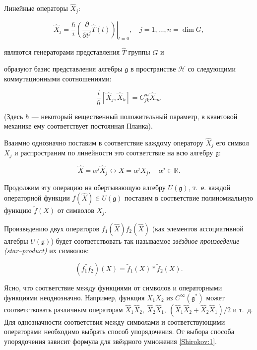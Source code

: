 Линейные операторы $\hat X_j$:

    \[\hat X_j=\frac{\hbar}{i}\left.\left(\frac{\partial}{\partial t^j}\hat T(t)\right)\right|_{t=0},\quad j=1,\dots,n=\dim G,

\]

являются генераторами представления $\hat T$ группы $G$ и

образуют базис представления алгебры $\mathfrak{g}$ в пространстве $\mathcal{H}$ со следующими коммутационными соотношениями:

\begin{equation}

\label{Shirokov:0}

\frac{i}{\hbar}[\hat X_j,\hat X_k]=C_{jk}^m \hat X_m.

\end{equation}

(Здесь $\hbar$ --- некоторый вещественный положительный параметр, в квантовой механике ему соответствует постоянная Планка).



Взаимно однозначно поставим в соответствие каждому оператору $\hat X_j$ его символ $X_j$ и распространим по линейности это соответствие на всю алгебру $\mathfrak{g}$: 

$$\hat X=\alpha^j\hat X_j\longleftrightarrow X=\alpha^jX_j,\quad  \alpha^j\in\mathbb{R}.$$

Продолжим эту операцию на обертывающую алгебру $U(\mathfrak{g})$, т.~е. каждой операторной функции $f(\hat X)\in U(\mathfrak{g})$ поставим в соответствие полиномиальную функцию $\tilde f(X)$ от символов $X_j$.



Произведению двух операторов $f_1(\hat X)f_2(\hat X)$ (как элементов ассоциативной алгебры $U(\mathfrak{g})$) будет соответствовать так называемое \textit{звёздное произведение (star--product)} \cite{Berezin} их символов:

\begin{equation}\label{Shirokov:1}

(\widetilde{f_1f_2})(X)=\tilde f_1(X)\ast \tilde f_2(X).

\end{equation}

Ясно, что соответствие между функциями от символов и операторными функциями неоднозначно. Например, функция $X_1X_2$ из $C^\infty(\mathfrak{g}^\ast)$ может соответствовать различным операторам $\hat X_1\hat X_2,\ \hat X_2\hat X_1,\ (\hat X_1\hat X_2+\hat X_2\hat X_1)/2$ и т.~д. Для однозначности соответствия между символами и соответствующими операторами необходимо выбрать способ упорядочения. От выбора способа упорядочения зависит формула для звёздного умножения \eqref{Shirokov:1}.



